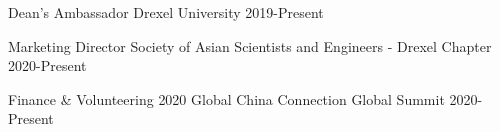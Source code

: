 
\begin{cvhonors}

  \cvhonor
  {Dean's Ambassador} %
  {Drexel University} %
  {2019-Present} %

  \cvhonor
  {Marketing Director} %
  {Society of Asian Scientists and Engineers - Drexel Chapter} %
  {2020-Present} %

  \cvhonor
  {Finance \& Volunteering} %
  {2020 Global China Connection Global Summit} %
  {2020-Present} %

\end{cvhonors}
